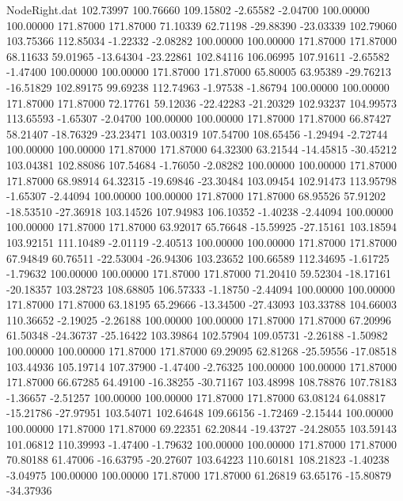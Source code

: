 \begin{filecontents}{NodeRight.dat}
 102.73997  100.76660  109.15802    -2.65582   -2.04700  100.00000  100.00000  171.87000  171.87000   71.10339   62.71198  -29.88390  -23.03339
 102.79060  103.75366  112.85034    -1.22332   -2.08282  100.00000  100.00000  171.87000  171.87000   68.11633   59.01965  -13.64304  -23.22861
 102.84116  106.06995  107.91611    -2.65582   -1.47400  100.00000  100.00000  171.87000  171.87000   65.80005   63.95389  -29.76213  -16.51829
 102.89175   99.69238  112.74963    -1.97538   -1.86794  100.00000  100.00000  171.87000  171.87000   72.17761   59.12036  -22.42283  -21.20329
 102.93237  104.99573  113.65593    -1.65307   -2.04700  100.00000  100.00000  171.87000  171.87000   66.87427   58.21407  -18.76329  -23.23471
 103.00319  107.54700  108.65456    -1.29494   -2.72744  100.00000  100.00000  171.87000  171.87000   64.32300   63.21544  -14.45815  -30.45212
 103.04381  102.88086  107.54684    -1.76050   -2.08282  100.00000  100.00000  171.87000  171.87000   68.98914   64.32315  -19.69846  -23.30484
 103.09454  102.91473  113.95798    -1.65307   -2.44094  100.00000  100.00000  171.87000  171.87000   68.95526   57.91202  -18.53510  -27.36918
 103.14526  107.94983  106.10352    -1.40238   -2.44094  100.00000  100.00000  171.87000  171.87000   63.92017   65.76648  -15.59925  -27.15161
 103.18594  103.92151  111.10489    -2.01119   -2.40513  100.00000  100.00000  171.87000  171.87000   67.94849   60.76511  -22.53004  -26.94306
 103.23652  100.66589  112.34695    -1.61725   -1.79632  100.00000  100.00000  171.87000  171.87000   71.20410   59.52304  -18.17161  -20.18357
 103.28723  108.68805  106.57333    -1.18750   -2.44094  100.00000  100.00000  171.87000  171.87000   63.18195   65.29666  -13.34500  -27.43093
 103.33788  104.66003  110.36652    -2.19025   -2.26188  100.00000  100.00000  171.87000  171.87000   67.20996   61.50348  -24.36737  -25.16422
 103.39864  102.57904  109.05731    -2.26188   -1.50982  100.00000  100.00000  171.87000  171.87000   69.29095   62.81268  -25.59556  -17.08518
 103.44936  105.19714  107.37900    -1.47400   -2.76325  100.00000  100.00000  171.87000  171.87000   66.67285   64.49100  -16.38255  -30.71167
 103.48998  108.78876  107.78183    -1.36657   -2.51257  100.00000  100.00000  171.87000  171.87000   63.08124   64.08817  -15.21786  -27.97951
 103.54071  102.64648  109.66156    -1.72469   -2.15444  100.00000  100.00000  171.87000  171.87000   69.22351   62.20844  -19.43727  -24.28055
 103.59143  101.06812  110.39993    -1.47400   -1.79632  100.00000  100.00000  171.87000  171.87000   70.80188   61.47006  -16.63795  -20.27607
 103.64223  110.60181  108.21823    -1.40238   -3.04975  100.00000  100.00000  171.87000  171.87000   61.26819   63.65176  -15.80879  -34.37936

\end{filecontents}
